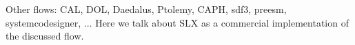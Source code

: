 Other flows: CAL, DOL, Daedalus, Ptolemy, CAPH, sdf3, preesm, systemcodesigner, ...
Here we talk about SLX as a commercial implementation of the discussed flow.
\Blindtext[5]
